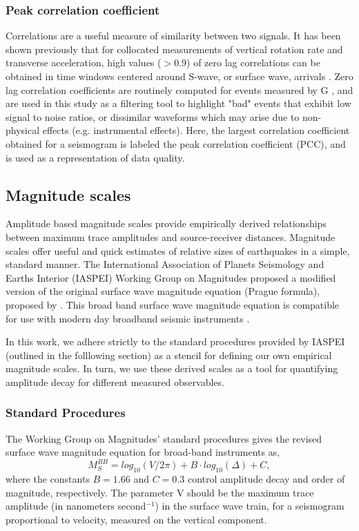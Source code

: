 \documentclass{gji}
\begin{document}
\subsubsection{Peak correlation coefficient}
Correlations are a useful measure of similarity between two signals. It has been shown previously that for collocated measurements of vertical rotation rate and transverse acceleration, high values ($>0.9$) of zero lag correlations can be obtained in time windows centered around S-wave, or surface wave, arrivals \cite{igel2007broad}.
Zero lag correlation coefficients are routinely computed for events measured by G \cite{salvermoser2017event},
and are used in this study as a filtering tool to highlight "bad" events that exhibit low signal to noise ratios, or dissimilar waveforms which may arise due to non-physical effects (e.g. instrumental effects). Here, the largest correlation coefficient obtained for a seismogram is labeled the peak correlation coefficient (PCC), and is used as a representation of data quality.


\subsection{Magnitude scales}
Amplitude based magnitude scales provide empirically derived relationships between maximum trace amplitudes and source-receiver distances. Magnitude scales offer useful and quick estimates of relative sizes of earthquakes in a simple, standard  manner. 
The International Association of Planets Seismology and Earths Interior (IASPEI) Working Group on Magnitudes proposed a modified version of the original surface wave magnitude equation (Prague formula), proposed by \cite{karnik1962standardization}.
This broad band surface wave magnitude equation is compatible for use with modern day broadband seismic instruments \cite{bormann2000new}.

In this work, we adhere strictly to the standard procedures provided by IASPEI (outlined in the folllowing section) as a stencil for defining our own empirical magnitude scales. In turn, we use these derived scales as a tool for quantifying amplitude decay for different measured observables.

\subsubsection{Standard Procedures}\label{standproc}
The Working Group on Magnitudes' standard procedures gives the revised surface wave magnitude equation for broad-band instruments as,
\begin{equation}\label{eq:mag}
	M_S^{BB} = log_{10}(V/2\pi) + B\cdot log_{10}(\Delta) + C, 
\end{equation}
where the constants $B=1.66$ and $C=0.3$ control amplitude decay and order of magnitude, respectively. The parameter V should be the maximum trace amplitude (in nanometers second$^{-1}$) in the surface wave train, for a seismogram proportional to velocity, measured on the vertical component. 
\end{document}

